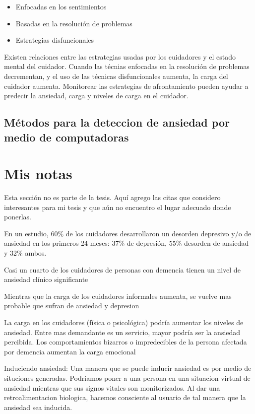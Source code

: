 \documentclass[letterpaper,12pt]{cicese}
\begin{document}
		\begin{itemize}
			\item Enfocadas en los sentimientos
			\item Basadas en la resoluci\'on de problemas
			\item Estrategias disfuncionales
		\end{itemize}
	
	Existen  relaciones entre las estrategias usadas por los cuidadores y el estado mental del cuidador. Cuando las t\'ecnias enfocadas en la resoluci\'on de problemas decrementan, y el uso de las t\'ecnicas disfuncionales aumenta, la carga del cuidador aumenta. Monitorear las estrategias de afrontamiento pueden ayudar a predecir la ansiedad, carga y niveles de carga en el cuidador\citep{Tutar2013P484}. 
	\section{M\'etodos para la deteccion de ansiedad por medio de computadoras}
	
	\newpage
		\chapter{Mis notas}
			Esta secci\'on no es parte de la tesis. Aqu\'i agrego las citas que considero interesantes para mi tesis y que a\'un no encuentro el lugar adecuado donde ponerlas.

	
	
		En un estudio, 60\% de los cuidadores desarrollaron un desorden depresivo y/o de ansiedad en los primeros 24 meses: 37\% de depresi\'on, 55\% desorden de ansiedad y 32\% ambos. \citep{Joling2014}

		Casi un cuarto de los cuidadores de personas con demencia tienen un nivel de ansiedad cl\'inico significante \citep{Cooper200615}

		Mientras que la carga de los cuidadores informales aumenta, se vuelve mas probable que sufran de ansiedad y depresion \citep{Denno20131731}

		La carga en los cuidadores (f\'isica o psicol\'ogica) podr\'ia aumentar los niveles de ansiedad. Entre mas demandante es un servicio, mayor podr\'ia ser la ansiedad percibida. Los comportamientos bizarros o impredecibles de la persona afectada por demencia aumentan la carga emocional \citep{Rosa201054}

		Induciendo ansiedad: Una manera que se puede inducir ansiedad es por medio de situciones generadas. Podriamos poner a una persona en una situacion virtual de ansiedad mientras que sus signos
		vitales son monitorizados. Al dar una retroalimentacion biologica, hacemos consciente al usuario de tal manera que la ansiedad sea inducida.
\end{document}
